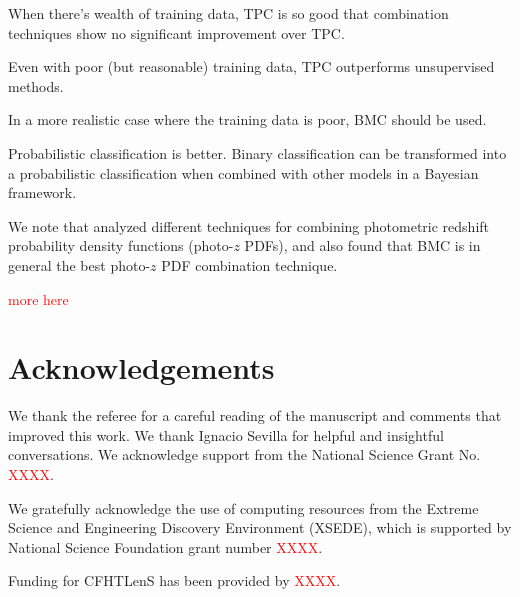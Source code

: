 \documentclass[useAMS,usenatbib]{mn2e}
\begin{document}
When there's wealth of training data,
TPC is so good that combination techniques show
no significant improvement over TPC.

Even with poor (but reasonable) training data,
TPC outperforms unsupervised methods.

In a more realistic case where the training data is poor,
BMC should be used.

Probabilistic classification is better.
Binary classification can be transformed into a probabilistic
classification when combined with other models in a Bayesian framework.

We note that \cite{carrascokind2014exhausting} analyzed
different techniques for combining
photometric redshift probability density functions (photo-$z$ PDFs),
and also found that BMC is in general the best
photo-$z$ PDF combination technique.

\textcolor{red}{more here}

\section*{Acknowledgements}

We thank the referee for a careful reading of the manuscript
and comments that improved this work.
We thank Ignacio Sevilla for helpful and insightful conversations.
We acknowledge support from the National Science Grant No.
\textcolor{red}{XXXX}.

We gratefully acknowledge the use of computing resources
from the Extreme Science and Engineering Discovery Environment (XSEDE),
which is supported by National Science Foundation grant number
\textcolor{red}{XXXX}.

Funding for CFHTLenS has been provided by
\textcolor{red}{XXXX}.





\bsp

\label{lastpage}
\end{document}
